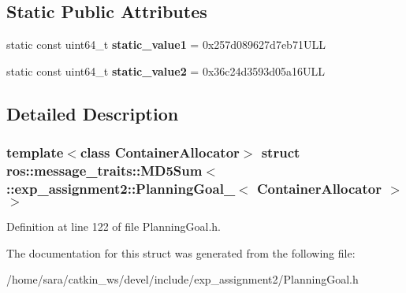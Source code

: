 \subsection*{Static Public Attributes}
\begin{DoxyCompactItemize}
\item 
\mbox{\label{structros_1_1message__traits_1_1MD5Sum_3_01_1_1exp__assignment2_1_1PlanningGoal___3_01ContainerAllocator_01_4_01_4_a2fea8979d876540017b295b298f6be47}} 
static const uint64\+\_\+t {\bfseries static\+\_\+value1} = 0x257d089627d7eb71\+U\+LL
\item 
\mbox{\label{structros_1_1message__traits_1_1MD5Sum_3_01_1_1exp__assignment2_1_1PlanningGoal___3_01ContainerAllocator_01_4_01_4_ac9ab99b1b753bfcfb6b43717abcb2202}} 
static const uint64\+\_\+t {\bfseries static\+\_\+value2} = 0x36c24d3593d05a16\+U\+LL
\end{DoxyCompactItemize}


\subsection{Detailed Description}
\subsubsection*{template$<$class Container\+Allocator$>$\newline
struct ros\+::message\+\_\+traits\+::\+M\+D5\+Sum$<$ \+::exp\+\_\+assignment2\+::\+Planning\+Goal\+\_\+$<$ Container\+Allocator $>$ $>$}



Definition at line 122 of file Planning\+Goal.\+h.



The documentation for this struct was generated from the following file\+:\begin{DoxyCompactItemize}
\item 
/home/sara/catkin\+\_\+ws/devel/include/exp\+\_\+assignment2/Planning\+Goal.\+h\end{DoxyCompactItemize}
